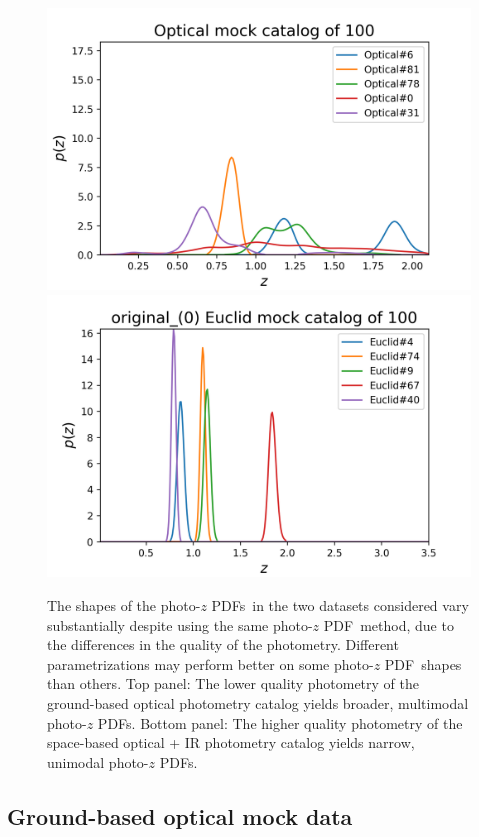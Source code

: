 \documentclass[\docopts]{\docclass}
\newcommand{\pz}{photo-$z$ PDF}
\begin{document}
\begin{figure}
  \includegraphics[width=0.9\columnwidth]{figures/lsst_pzs.png}\\
  \includegraphics[width=0.9\columnwidth]{figures/euclid_pzs.png}
  \caption{The shapes of the \pz s\ in the two datasets considered vary 
substantially despite using the same \pz\ method, due to the differences in the 
quality of the photometry.  Different parametrizations may perform better on 
some \pz\ shapes than others.  Top panel: The lower quality photometry of the 
ground-based optical photometry catalog yields broader, multimodal \pz s. 
Bottom panel: The higher quality photometry of the space-based optical + IR 
photometry catalog yields narrow, unimodal \pz s.
  \label{fig:pzs}}
\end{figure}

\subsection{Ground-based optical mock data}
\label{sec:LSST}
\end{document}
